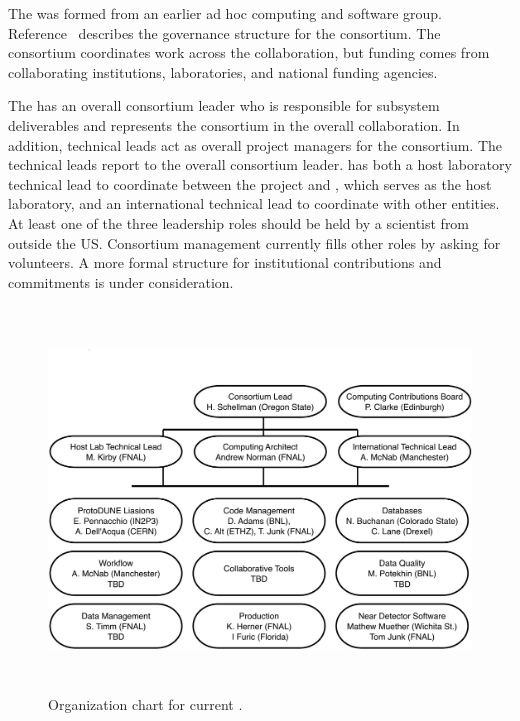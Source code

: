 The  was formed from an earlier ad hoc  computing and software group. %
Reference~\cite{bib:docdb12751} describes the governance structure for the consortium.  The consortium coordinates work across the collaboration, but funding comes from collaborating institutions, laboratories, and national funding agencies. %

The %
 has an overall consortium leader %
who is responsible for subsystem deliverables and represents the consortium in the overall  collaboration.
In addition, technical leads act as overall project managers for the consortium. The technical leads report to the overall consortium leader.
 has both a host laboratory technical lead to coordinate between the  project and \fnal, which serves as the host laboratory, and an international  technical lead to coordinate with other entities.
At least one of the three leadership roles should be held by a scientist from outside the US. 
Consortium management currently fills other roles by asking for volunteers.  A more formal structure for institutional contributions and commitments is under consideration. 


\begin{figure}[htp]
\centering
\includegraphics[height=4in]{graphics/Comp_Org_Chart.pdf}
\caption[Organization chart for current ]{Organization chart for current . }
\label{fig:ch-exec-comp-org-es}
\end{figure}


